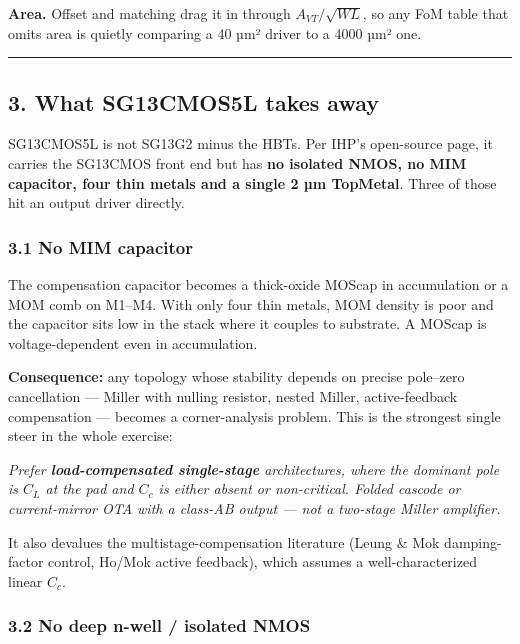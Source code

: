 \documentclass[
  10pt,
  a4paper,
]{article}
\renewenvironment{quote}
  {\begin{oldquote}\itshape\color{DarkSlateGray}}
  {\end{oldquote}}
\begin{document}
\textbf{Area.} Offset and matching drag it in through
\(A_{VT}/\sqrt{WL}\), so any FoM table that omits area is quietly
comparing a 40 µm² driver to a 4000 µm² one.

\begin{center}\rule{0.5\linewidth}{0.5pt}\end{center}

\hypertarget{what-sg13cmos5l-takes-away}{%
\subsection{3. What SG13CMOS5L takes
away}\label{what-sg13cmos5l-takes-away}}

SG13CMOS5L is not SG13G2 minus the HBTs. Per IHP's open-source page, it
carries the SG13CMOS front end but has \textbf{no isolated NMOS, no MIM
capacitor, four thin metals and a single 2 µm TopMetal}. Three of those
hit an output driver directly.

\hypertarget{no-mim-capacitor}{%
\subsubsection{3.1 No MIM capacitor}\label{no-mim-capacitor}}

The compensation capacitor becomes a thick-oxide MOScap in accumulation
or a MOM comb on M1--M4. With only four thin metals, MOM density is poor
and the capacitor sits low in the stack where it couples to substrate. A
MOScap is voltage-dependent even in accumulation.

\textbf{Consequence:} any topology whose stability depends on precise
pole--zero cancellation --- Miller with nulling resistor, nested Miller,
active-feedback compensation --- becomes a corner-analysis problem. This
is the strongest single steer in the whole exercise:

\begin{quote}
Prefer \textbf{load-compensated single-stage} architectures, where the
dominant pole is \(C_L\) at the pad and \(C_c\) is either absent or
non-critical. Folded cascode or current-mirror OTA with a class-AB
output --- not a two-stage Miller amplifier.
\end{quote}

It also devalues the multistage-compensation literature (Leung \& Mok
damping-factor control, Ho/Mok active feedback), which assumes a
well-characterized linear \(C_c\).

\hypertarget{no-deep-n-well-isolated-nmos}{%
\subsubsection{3.2 No deep n-well / isolated
NMOS}\label{no-deep-n-well-isolated-nmos}}
\end{document}
